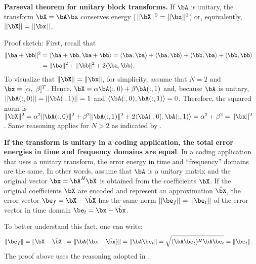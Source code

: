 \bTheorem
\label{th:parseval} \textbf{Parseval theorem for unitary block transforms.} If $\bA$ is unitary, the transform $\bX=\bA \bx$ conserves energy ($||\bX||^2=||\bx||^2$) or, equivalently, $||\bX||=||\bx||$.

Proof sketch: First, recall that
\begin{align*} 
        \label{eq:norm_sum}
        \lVert\ba + \bb\rVert^2 &= \langle\ba+\bb, \ba+\bb\rangle
                                                                                = \langle\ba,\ba\rangle + \langle\ba,\bb\rangle + \langle\bb,\ba\rangle + \langle\bb,\bb\rangle \\
                                                                                &= \lVert\ba\rVert^2 + \lVert\bb\rVert^2 + 2 \langle\ba,\bb\rangle.
\end{align*}
To visualize that $\lVert\bX\rVert = \lVert \bx\rVert$, for simplicity, assume that $N=2$ and $\bx=[\alpha,~\beta]^T$. Hence, $\bX = \alpha \bA(:,0) + \beta \bA(:,1)$ and, because $\bA$ is unitary,  $||\bA(:,0)||=||\bA(:,1)||=1$ and $\langle\bA(:,0),\bA(:,1)\rangle=0$. Therefore, the squared norm is $\lVert\bX\rVert^2 = \alpha^2 \lVert\bA(:,0)\rVert^2 + \beta^2 \lVert\bA(:,1)\rVert^2 + 2\langle\bA(:,0),\bA(:,1)\rangle = \alpha^2 + \beta^2 = \lVert\bx\rVert^2$. Same reasoning applies for $N>2$ as indicated by .
\eTheorem

\bExample \textbf{If the transform is unitary in a coding application, the total error energies in time and frequency domains are equal}.
In a coding application that uses a unitary transform, the error energy in time and ``frequency'' domains are the same. In other words, assume that $\bA$ is a unitary matrix and the original vector $\bx = \bA^H \bX$ is obtained from the coefficients $\bX$. If the original coefficients $\bX$ are encoded and represent an approximation $\hat \bX$, the error vector $\be_f=\bX - \hat \bX$ has the same norm $||\be_f||=||\be_t||$ of the error vector in time domain $\be_t = \bx - \hat \bx$.

To better understand this fact, one can write:
\begin{equation}
\lVert \be_f \rVert = \lVert\bX-\hat \bX \rVert = \lVert \bA (\bx- \hat \bx) \rVert = \lVert \bA \be_t \rVert = \sqrt{(\bA\be_t)^H \bA\be_t} = \lVert \be_t \rVert.
\label{eq:sameErrorWhenTransformIsUnitary}
\end{equation}
The proof above uses the reasoning adopted in .
\eExample

